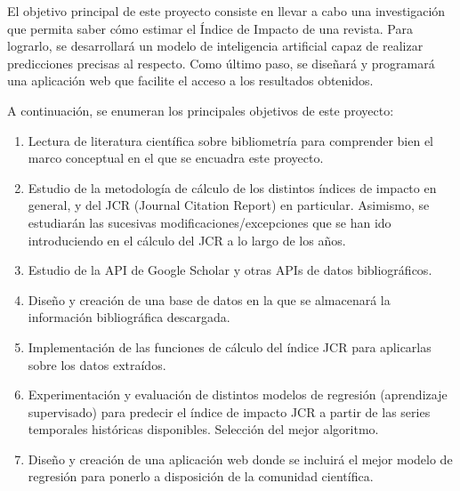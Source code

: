 
El objetivo principal de este proyecto consiste en llevar a cabo una investigación que permita saber cómo estimar el Índice de Impacto de una revista. Para lograrlo, se desarrollará un modelo de inteligencia artificial capaz de realizar predicciones precisas al respecto. Como último paso, se diseñará y programará una aplicación web que facilite el acceso a los resultados obtenidos.

A continuación, se enumeran los principales objetivos de este proyecto:

\begin{enumerate}
\item Lectura de literatura científica sobre bibliometría para comprender bien el marco conceptual en el que se encuadra este proyecto.
\item Estudio de la metodología de cálculo de los distintos índices de impacto en general, y del JCR (Journal Citation Report) en particular. Asimismo, se estudiarán las sucesivas modificaciones/excepciones que se han ido introduciendo en el cálculo del JCR a lo largo de los años.
\item Estudio de la API de Google Scholar y otras APIs de datos bibliográficos.
\item Diseño y creación de una base de datos en la que se almacenará la información bibliográfica descargada.
\item Implementación de las funciones de cálculo del índice JCR para aplicarlas sobre los datos extraídos. 
\item Experimentación y evaluación de distintos modelos de regresión (aprendizaje supervisado) para predecir el índice de impacto JCR a partir de las series temporales históricas disponibles. Selección del mejor algoritmo.
\item Diseño y creación de una aplicación web donde se incluirá el mejor modelo de regresión para ponerlo a disposición de la comunidad científica.
\end{enumerate}